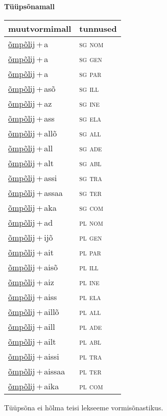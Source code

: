 
\vspace{1.8em}
\begin{minipage}{\textwidth}
\textbf{Tüüpsõnamall \,}\\

\begin{sideways}
\begin{tabular}{l l}
muutvormimall & tunnused \\
\hline
\underline{õmpõlij}\,+\,a & \textsc{ sg nom } \\
\underline{õmpõlij}\,+\,a & \textsc{ sg gen } \\
\underline{õmpõlij}\,+\,a & \textsc{ sg par } \\
\underline{õmpõlij}\,+\,asõ & \textsc{ sg ill } \\
\underline{õmpõlij}\,+\,az & \textsc{ sg ine } \\
\underline{õmpõlij}\,+\,ass & \textsc{ sg ela } \\
\underline{õmpõlij}\,+\,allõ & \textsc{ sg all } \\
\underline{õmpõlij}\,+\,all & \textsc{ sg ade } \\
\underline{õmpõlij}\,+\,alt & \textsc{ sg abl } \\
\underline{õmpõlij}\,+\,assi & \textsc{ sg tra } \\
\underline{õmpõlij}\,+\,assaa & \textsc{ sg ter } \\
\underline{õmpõlij}\,+\,aka & \textsc{ sg com } \\
\underline{õmpõlij}\,+\,ad & \textsc{ pl nom } \\
\underline{õmpõlij}\,+\,ijõ & \textsc{ pl gen } \\
\underline{õmpõlij}\,+\,ait & \textsc{ pl par } \\
\underline{õmpõlij}\,+\,aisõ & \textsc{ pl ill } \\
\underline{õmpõlij}\,+\,aiz & \textsc{ pl ine } \\
\underline{õmpõlij}\,+\,aiss & \textsc{ pl ela } \\
\underline{õmpõlij}\,+\,aillõ & \textsc{ pl all } \\
\underline{õmpõlij}\,+\,aill & \textsc{ pl ade } \\
\underline{õmpõlij}\,+\,ailt & \textsc{ pl abl } \\
\underline{õmpõlij}\,+\,aissi & \textsc{ pl tra } \\
\underline{õmpõlij}\,+\,aissaa & \textsc{ pl ter } \\
\underline{õmpõlij}\,+\,aika & \textsc{ pl com } \\
\end{tabular}
\end{sideways}
\label{tab:tüüpsõnamall-õmpõlija}

\end{minipage}

 
\vspace{1em}
\noindent Tüüpsõna ei hõlma teisi lekseeme vormi\-sõnastikus.
